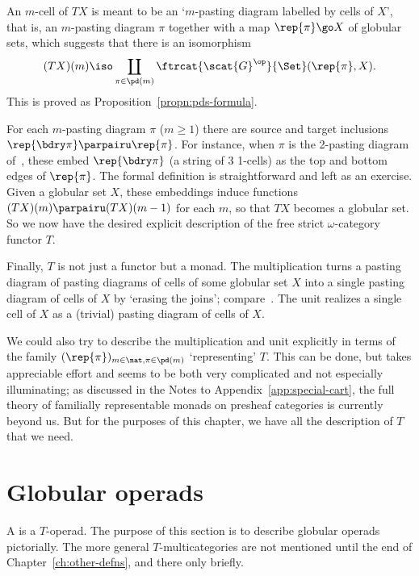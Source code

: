 An $m$-cell of $TX$ is meant to be an
`$m$-pasting diagram labelled%
%
%
by cells of $X$', that is, an $m$-pasting
diagram $\pi$ together with a map $\rep{\pi} \go X$ of globular sets, which
suggests that there is an isomorphism
%
\begin{equation}	\label{eq:pd-rep-of-T}
(TX)(m) \iso \coprod_{\pi\in\pd(m)} 
\ftrcat{\scat{G}^\op}{\Set}(\rep{\pi}, X).
\end{equation}
%
This is proved as Proposition~\ref{propn:pds-formula}.  

For each $m$-pasting diagram $\pi$ ($m\geq 1$) there are source%
%
%
and target
inclusions $\rep{\bdry\pi} \parpairu \rep{\pi}$.%
%
%
For instance, when $\pi$ is the 2-pasting diagram
of~, these embed
$\rep{\bdry\pi}$ (a string of 3 1-cells) as the top and bottom edges of
$\rep{\pi}$.  The formal definition is straightforward and left as an
exercise.  Given a globular set $X$, these embeddings induce functions
$(TX)(m) \parpairu (TX)(m-1)$ for each $m$, so that $TX$ becomes a globular
set.  So we now have the desired explicit description of the free strict
$\omega$-category functor $T$.

Finally, $T$ is not just a functor but a monad.  The multiplication turns a
pasting diagram of pasting diagrams of cells of some globular set $X$ into
a single pasting diagram of cells of $X$ by `erasing the joins';
compare~.  The unit realizes a single cell of $X$ as a
(trivial) pasting diagram of cells of $X$.

We could also try to describe the multiplication and unit explicitly in
terms of the family $(\rep{\pi})_{m\in\nat, \pi\in\pd(m)}$ `representing'
$T$.  This can be done, but takes appreciable effort and seems to be both
very complicated and not especially illuminating; as discussed in the
Notes to Appendix~\ref{app:special-cart}, the full theory of familially
representable monads on presheaf categories is currently beyond us.  But
for the purposes of this chapter, we have all the description of $T$ that
we need. 



\section{Globular operads}

A  is a $T$-operad.  The purpose of this section is
to describe globular operads pictorially.  The more general
$T$-multicategories are not mentioned until the end of
Chapter~\ref{ch:other-defns}, and there only briefly.

